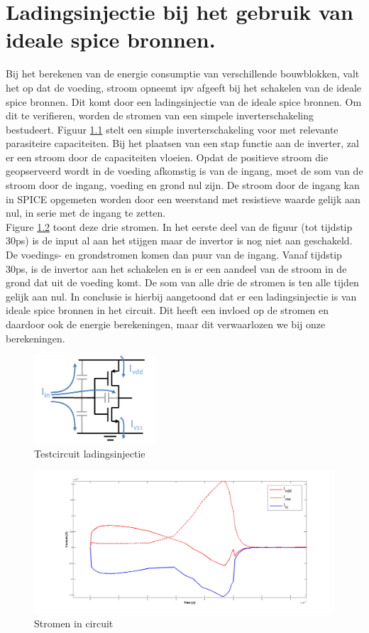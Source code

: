 \chapter{Ladingsinjectie bij het gebruik van ideale spice bronnen.}
\label{app:chargeinj}
Bij het berekenen van de energie consumptie van verschillende bouwblokken, valt het op dat de voeding, stroom opneemt ipv afgeeft bij het schakelen van de ideale spice bronnen. Dit komt door een ladingsinjectie van de ideale spice bronnen. Om dit te verifieren, worden de stromen van een simpele inverterschakeling bestudeert. Figuur \ref{fig:chargeinj_inv} stelt een simple inverterschakeling voor met relevante parasiteire capaciteiten. Bij het plaatsen van een stap functie aan de inverter, zal er een stroom door de capaciteiten vloeien. Opdat de positieve stroom die geopserveerd wordt in de voeding afkomstig is van de ingang, moet de som van de stroom door de ingang, voeding en grond nul zijn. De stroom door de ingang kan in SPICE opgemeten worden door een weerstand met resistieve waarde gelijk aan nul, in serie met de ingang te zetten.\\
Figure \ref{fig:chargeinj_cur} toont deze drie stromen. In het eerste deel van de figuur (tot tijdstip 30ps) is de input al aan het stijgen maar de invertor is nog niet aan geschakeld. De voedings- en grondstromen komen dan puur van de ingang. Vanaf tijdstip 30ps, is de invertor aan het schakelen en is er een aandeel van de stroom in de grond dat uit de voeding komt. De som van alle drie de stromen is ten alle tijden gelijk aan nul.
In conclusie is hierbij aangetoond dat er een ladingsinjectie is van ideale spice bronnen in het circuit. Dit heeft een invloed op de stromen en daardoor ook de energie berekeningen, maar dit verwaarlozen we bij onze berekeningen.

\begin{figure}[!ht]
  \centering
  \includegraphics[width=0.4\textwidth]{../fig/hfdst-chargeinj-inv.png}
  \caption[Ladingsinjectie: testcircuit]{Testcircuit ladingsinjectie}
  \label{fig:chargeinj_inv}
\end{figure}

\begin{figure}[!ht]
  \centering
  \includegraphics[width=\textwidth]{../fig/hfdst-chargeinj-currents.png}
  \caption[Ladingsinjectie: stroom]{Stromen in circuit}
  \label{fig:chargeinj_cur}
\end{figure}